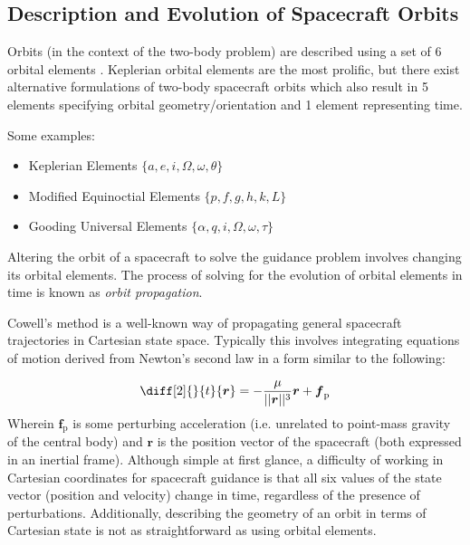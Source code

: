 \subsection{Description and Evolution of Spacecraft Orbits}

Orbits (in the context of the two-body problem) are described using a set of 6 orbital elements \cite{book:1487513}. Keplerian orbital elements are the most prolific, but there exist alternative formulations of two-body spacecraft orbits which also result in 5 elements specifying orbital geometry/orientation and 1 element representing time.

Some examples:
\begin{itemize}
  \item Keplerian Elements \(\{a, e, i, \Omega, \omega, \theta\}\)
  \item Modified Equinoctial Elements \(\{p, f, g, h, k, L\}\) \cite{walker1985set}
  \item Gooding Universal Elements  \(\{\alpha, q, i, \Omega, \omega, \tau\}\) \cite{gooding_universal_elements}
\end{itemize}

Altering the orbit of a spacecraft to solve the guidance problem involves changing its orbital elements. The process of solving for the evolution of orbital elements in time is known as \textit{orbit propagation}.

Cowell's method \cite{book:1487513} is a well-known way of propagating general spacecraft trajectories in Cartesian state space. Typically this involves integrating equations of motion derived from Newton's second law in a form similar to the following:

\begin{equation}
  \diff[2]{}{t}{\boldsymbol{r}} = -\frac{\mu}{||\boldsymbol{r}||^3} \boldsymbol{r} + \boldsymbol{f}_\mathrm{p} \label{eq:cowells_method}
\end{equation}
Wherein \(\boldsymbol{f}_\mathrm{p}\) is some perturbing acceleration (i.e. unrelated to point-mass gravity of the central body) and \(\boldsymbol{r}\) is the position vector of the spacecraft (both expressed in an inertial frame). Although simple at first glance, a difficulty of working in Cartesian coordinates for spacecraft guidance is that all six values of the state vector (position and velocity) change in time, regardless of the presence of perturbations. Additionally, describing the geometry of an orbit in terms of Cartesian state is not as straightforward as using orbital elements.

